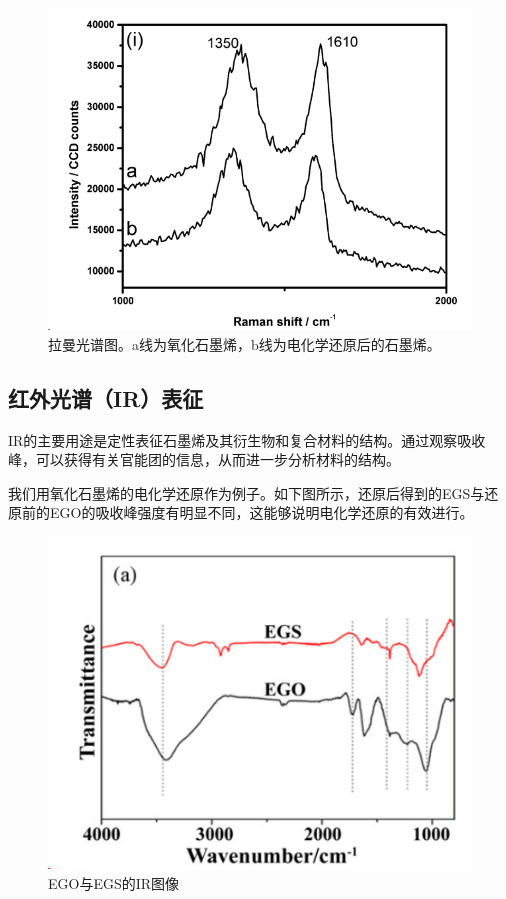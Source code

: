 \begin{figure}
    \centering
    \includegraphics[scale=0.4]{img/Raman}
    \caption{拉曼光谱图。a线为氧化石墨烯，b线为电化学还原后的石墨烯。}
\end{figure}


\subsection{红外光谱（IR）表征}

IR的主要用途是定性表征石墨烯及其衍生物和复合材料的结构。通过观察吸收峰，可以获得有关官能团的信息，从而进一步分析材料的结构。

我们用氧化石墨烯的电化学还原作为例子。如下图所示，还原后得到的EGS与还原前的EGO的吸收峰强度有明显不同，这能够说明电化学还原的有效进行\cite{RN32}。

\begin{figure}
    \centering
    \includegraphics[scale=0.4]{img/IR}
    \caption{EGO与EGS的IR图像}
\end{figure}


